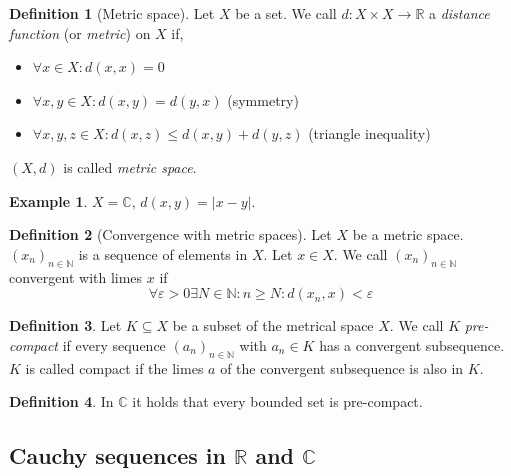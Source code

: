 \documentclass[a4paper,landscape,twocolumn]{article}
\theoremstyle{definition}
\newtheorem{defi}{Definition}
\newtheorem{ex}{Example}
\newcommand\abs[1]{\left|#1\right|}
\newcommand\seq[1]{{\left(#1\right)}_{n \in \mathbb N}}
\begin{document}
\begin{defi}[Metric space]
  Let $X$ be a set. We call $d: X \times X \rightarrow \mathbb R$ a \emph{distance function} (or \emph{metric}) on $X$ if,
  \begin{itemize}
    \item $\forall x \in X: d(x, x) = 0$
    \item $\forall x,y \in X: d(x, y) = d(y, x)$ (symmetry)
    \item $\forall x,y,z \in X: d(x,z) \leq d(x,y) + d(y,z)$ (triangle inequality)
  \end{itemize}
  $(X, d)$ is called \emph{metric space}.
\end{defi}
\begin{ex}
  $X = \mathbb C$, $d(x, y) = \abs{x - y}$.
\end{ex}

\begin{defi}[Convergence with metric spaces]
  Let $X$ be a metric space. $(x_n)_{n \in \mathbb N}$ is a sequence of elements in $X$.
  Let $x \in X$. We call $\seq{x_n}$ convergent with limes $x$ if
  \[ \forall \varepsilon > 0 \exists N \in \mathbb N: n \geq N: d(x_n, x) < \varepsilon \]
\end{defi}


\begin{defi}
  Let $K \subseteq X$ be a subset of the metrical space $X$. We call $K$ \emph{pre-compact}
  if every sequence $\seq{a_n}$ with $a_n \in K$ has a convergent subsequence.
  $K$ is called compact if the limes $a$ of the convergent subsequence is also in $K$.
\end{defi}

\begin{defi}
  In $\mathbb C$ it holds that every bounded set is pre-compact.
\end{defi}

\subsection{Cauchy sequences in $\mathbb R$ and $\mathbb C$}
%
\end{document}
